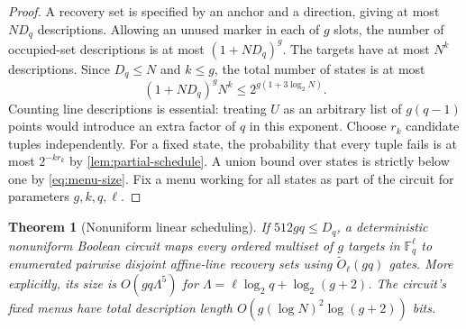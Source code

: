 \documentclass[11pt]{article}
\newtheorem{theorem}{Theorem}[section]
\newcommand{\F}{\mathbb{F}}
\begin{document}
\begin{proof}
A recovery set is specified by an anchor and a direction, giving at most
$ND_q$ descriptions.  Allowing an unused marker in each of $g$ slots, the
number of occupied-set descriptions is at most $(1+ND_q)^g$.  The targets
have at most $N^k$ descriptions.  Since $D_q\le N$ and $k\le g$, the total
number of states is at most
\[
  (1+ND_q)^gN^k\le2^{g(1+3\log_2N)}.
\]
Counting line descriptions is essential: treating $U$ as an arbitrary list
of $g(q-1)$ points would introduce an extra factor of $q$ in this exponent.
Choose $r_k$ candidate tuples independently.  For a fixed state, the
probability that every tuple fails is at most $2^{-kr_k}$ by
\cref{lem:partial-schedule}.  A union bound over states is strictly below
one by \eqref{eq:menu-size}.  Fix a menu working for all states as part of
the circuit for parameters $g,k,q,\ell$.
\end{proof}

\begin{samepage}
\begin{theorem}[Nonuniform linear scheduling]\label{thm:linear-scheduler}
If $512gq\le D_q$, a deterministic nonuniform Boolean circuit maps every
ordered multiset of $g$ targets in $\F_q^\ell$ to enumerated pairwise disjoint
affine-line recovery sets using $\widetilde O_\ell(gq)$ gates.
More explicitly, its size is $O(gq\Lambda^5)$ for
$\Lambda=\ell\log_2q+\log_2(g+2)$.
The circuit's fixed menus have total description length
$O(g(\log N)^2\log(g+2))$ bits.
\end{theorem}
\end{samepage}
\end{document}
